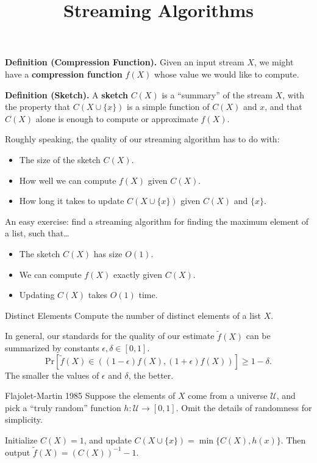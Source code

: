 \title{Streaming Algorithms}



\textbf{Definition (Compression Function).} Given an input stream $X$, we might have a \textbf{compression function} $f(X)$ whose value we would like to compute.

\textbf{Definition (Sketch).} A \textbf{sketch} $C(X)$ is a ``summary'' of the stream $X$, with the property that $C(X \cup \{x\})$ is a simple function of $C(X)$ and $x$, and that $C(X)$ alone is enough to compute or approximate $f(X)$.

Roughly speaking, the quality of our streaming algorithm has to do with:
\begin{itemize}
    \item The size of the sketch $C(X)$.
    \item How well we can compute $f(X)$ given $C(X)$.
    \item How long it takes to update $C(X \cup \{x\})$ given $C(X)$ and $\{x\}$.
\end{itemize}
\begin{remark}
    An easy exercise: find a streaming algorithm for finding the maximum element of a list, such that\dots
    \begin{itemize}
        \item The sketch $C(X)$ has size $O(1)$.
        \item We can compute $f(X)$ exactly given $C(X)$.
        \item Updating $C(X)$ takes $O(1)$ time.
    \end{itemize}
\end{remark}

\begin{problem}{Distinct Elements}
    Compute the number of distinct elements of a list $X$.
\end{problem}

In general, our standards for the quality of our estimate $\tilde{f}(X)$ can be summarized by constants $\epsilon, \delta \in [0, 1]$.
\[ \mathrm{Pr}\left [ \tilde{f}(X) \in ((1 - \epsilon) f(X), (1 + \epsilon)f(X)) \right] \geq 1 - \delta. \]
The smaller the values of $\epsilon$ and $\delta$, the better.

\begin{solution}{Flajolet-Martin 1985}
    Suppose the elements of $X$ come from a universe $\mathcal{U}$, and pick a ``truly random'' function $h: \mathcal{U} \to [0, 1]$.  Omit the details of randomness for simplicity.

    Initialize $C(X) = 1$, and update $C(X \cup \{x\}) = \min\{C(X), h(x)\}$.  Then output $\tilde{f}(X) = (C(X))^{-1} - 1$.
\end{solution}

